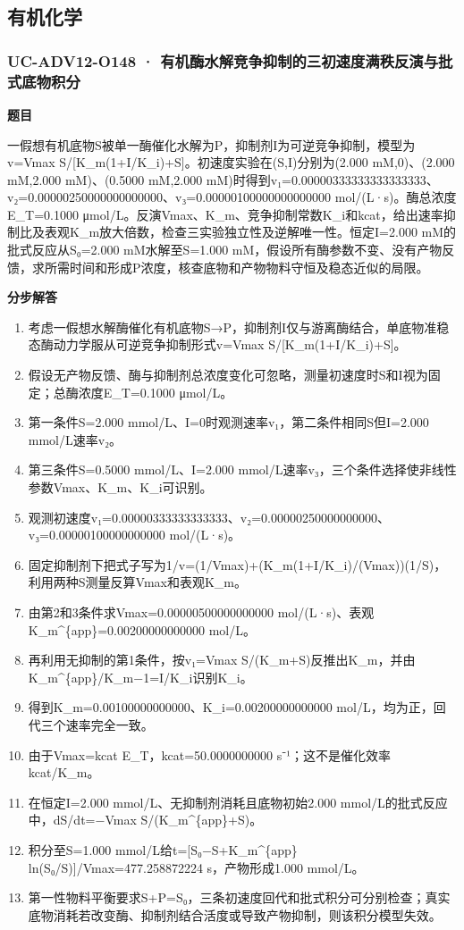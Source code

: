 \documentclass[UTF8,11pt,a4paper]{ctexart}
\begin{document}
\subsection*{有机化学}
\subsubsection*{UC-ADV12-O148 · 有机酶水解竞争抑制的三初速度满秩反演与批式底物积分}
\noindent\textbf{题目}\par
一假想有机底物S被单一酶催化水解为P，抑制剂I为可逆竞争抑制，模型为v=Vmax S/[K\_m(1+I/K\_i)+S]。初速度实验在(S,I)分别为(2.000 mM,0)、(2.000 mM,2.000 mM)、(0.5000 mM,2.000 mM)时得到v₁=0.00000333333333333333、v₂=0.00000250000000000000、v₃=0.00000100000000000000 mol/(L·s)。酶总浓度E\_T=0.1000 μmol/L。反演Vmax、K\_m、竞争抑制常数K\_i和kcat，给出速率抑制比及表观K\_m放大倍数，检查三实验独立性及逆解唯一性。恒定I=2.000 mM的批式反应从S₀=2.000 mM水解至S=1.000 mM，假设所有酶参数不变、没有产物反馈，求所需时间和形成P浓度，核查底物和产物物料守恒及稳态近似的局限。\par
\medskip\noindent\textbf{分步解答}
\begin{enumerate}
\item 考虑一假想水解酶催化有机底物S→P，抑制剂I仅与游离酶结合，单底物准稳态酶动力学服从可逆竞争抑制形式v=Vmax S/[K\_m(1+I/K\_i)+S]。
\item 假设无产物反馈、酶与抑制剂总浓度变化可忽略，测量初速度时S和I视为固定；总酶浓度E\_T=0.1000 μmol/L。
\item 第一条件S=2.000 mmol/L、I=0时观测速率v₁，第二条件相同S但I=2.000 mmol/L速率v₂。
\item 第三条件S=0.5000 mmol/L、I=2.000 mmol/L速率v₃，三个条件选择使非线性参数Vmax、K\_m、K\_i可识别。
\item 观测初速度v₁=0.00000333333333333、v₂=0.00000250000000000、v₃=0.00000100000000000 mol/(L·s)。
\item 固定抑制剂下把式子写为1/v=(1/Vmax)+(K\_m(1+I/K\_i)/(Vmax))(1/S)，利用两种S测量反算Vmax和表观K\_m。
\item 由第2和3条件求Vmax=0.00000500000000000 mol/(L·s)、表观K\_m\textasciicircum{}\{app\}=0.00200000000000 mol/L。
\item 再利用无抑制的第1条件，按v₁=Vmax S/(K\_m+S)反推出K\_m，并由K\_m\textasciicircum{}\{app\}/K\_m−1=I/K\_i识别K\_i。
\item 得到K\_m=0.00100000000000、K\_i=0.00200000000000 mol/L，均为正，回代三个速率完全一致。
\item 由于Vmax=kcat E\_T，kcat=50.0000000000 s⁻¹；这不是催化效率kcat/K\_m。
\item 在恒定I=2.000 mmol/L、无抑制剂消耗且底物初始2.000 mmol/L的批式反应中，dS/dt=−Vmax S/(K\_m\textasciicircum{}\{app\}+S)。
\item 积分至S=1.000 mmol/L给t=[S₀−S+K\_m\textasciicircum{}\{app\} ln(S₀/S)]/Vmax=477.258872224 s，产物形成1.000 mmol/L。
\item 第一性物料平衡要求S+P=S₀，三条初速度回代和批式积分可分别检查；真实底物消耗若改变酶、抑制剂结合活度或导致产物抑制，则该积分模型失效。
\end{enumerate}
\end{document}
